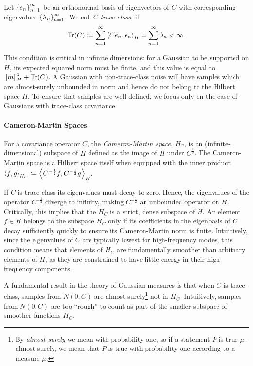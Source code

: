 Let \(\qty{e_{n}}_{n=1}^{\infty}\) be an orthonormal basis of eigenvectors of \(C\) with corresponding eigenvalues \(\qty{\lambda_{n}}_{n=1}^{\infty}\). We call \(C\) \textit{trace class}, if
\[
  \operatorname{Tr}(C) \coloneqq \sum_{n=1}^{\infty} \ev{C e_{n}, e_{n}}_{H} = \sum_{n=1}^{\infty} \lambda_{n} < \infty.
\]

This condition is critical in infinite dimensions: for a Gaussian to be supported on \(H\), its expected squared norm must be finite, and this value is equal to \(\norm{m}^{2}_{H} + \operatorname{Tr}(C)\). A Gaussian with non-trace-class noise will have samples which are almost-surely unbounded in norm and hence do not belong to the Hilbert space \(H\). To ensure that samples are well-defined, we focus only on the case of Gaussians with trace-class covariance.

\paragraph{Cameron-Martin Spaces}

For a covariance operator \(C\), the \textit{Cameron-Martin space}, \(H_{C}\), is an (infinite-dimensional) subspace of \(H\) defined as the image of \(H\) under \(C^{\frac{1}{2}}\). The Cameron-Martin space is a Hilbert space itself when equipped with the inner product \(\ev{f, g}_{H_{C}} \coloneqq \ev{C^{-\frac{1}{2}}f, C^{-\frac{1}{2}}g}_{H}\).

If \(C\) is trace class its eigenvalues must decay to zero. Hence, the eigenvalues of the operator \(C^{-\frac{1}{2}}\) diverge to infinity, making \(C^{-\frac{1}{2}}\) an unbounded operator on \(H\). Critically, this implies that the \(H_{C}\) is a strict, dense subspace of \(H\). An element \(f \in H\) belongs to the subspace \(H_{C}\) only if its coefficients in the eigenbasis of \(C\) decay sufficiently quickly to ensure its Cameron-Martin norm is finite. Intuitively, since the eigenvalues of \(C\) are typically lowest for high-frequency modes, this condition means that elements of \(H_{C}\) are fundamentally smoother than arbitrary elements of \(H\), as they are constrained to have little energy in their high-frequency components.

A fundamental result in the theory of Gaussian measures is that when \(C\) is trace-class, samples from \(N(0, C)\) are almost surely\footnote{By \textit{almost surely} we mean with probability one, so if a statement \(P\) is true \(\mu\)-almost surely, we mean that \(P\) is true with probability one according to a measure \(\mu\).} not in \(H_{C}\). Intuitively, samples from \(N(0,C) \) are too ``rough'' to count as part of the smaller subspace of smoother functions \(H_{C}\).

